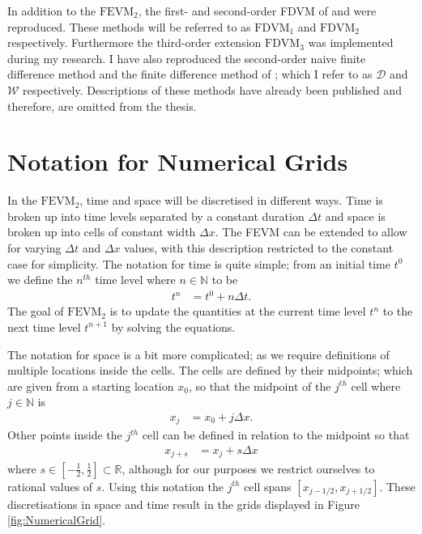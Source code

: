  
In addition to the $\text{FEVM}_2$, the first- and second-order FDVM of \citet{Hank-etal-2010-2034} and \citet{Zoppou-etal-2017} were reproduced. These methods will be referred to as $\text{FDVM}_1$ and $\text{FDVM}_2$ respectively. Furthermore the third-order extension $\text{FDVM}_3$ was implemented during my research. I have also reproduced the second-order naive finite difference method \cite{Pitt-J-2014} and the finite difference method of \citet{El-etal-2006}; which I refer to as $\mathcal{D}$ and $\mathcal{W}$ respectively. Descriptions of these methods have already been published \cite{Zoppou-etal-2017,Pitt-2018-61} and therefore, are omitted from the thesis.


\section{Notation for Numerical Grids}

In the $\text{FEVM}_2$, time and space will be discretised in different ways. Time is broken up into time levels separated by a constant duration $\Delta t$ and space is broken up into cells of constant width $\Delta x$. The FEVM can be extended to allow for varying $\Delta t$ and $\Delta x$ values, with this description restricted to the constant case for simplicity. The notation for time is quite simple; from an initial time $t^0$ we define the $n^{th}$ time level where $n \in \mathbb{N}$ to be
\begin{align*}
t^n &= t^0 + n \Delta t.
\end{align*}
The goal of $\text{FEVM}_2$ is to update the quantities at the current time level $t^n$ to the next time level $t^{n+1}$ by solving the equations. 

The notation for space is a bit more complicated; as we require definitions of multiple locations inside the cells. The cells are defined by their midpoints; which are given from a starting location $x_0$, so that the midpoint of the $j^{th}$ cell where $j \in \mathbb{N}$ is
\begin{align*}
x_j &= x_0 + j \Delta x.
\end{align*}
Other points inside the $j^{th}$ cell can be defined in relation to the midpoint so that 
\begin{align*}
x_{j + s} &= x_j + s \Delta x
\end{align*}
where $s \in \left[-\frac{1}{2} , \frac{1}{2}\right] \subset\mathbb{R}$, although for our purposes we restrict ourselves to rational values of $s$. Using this notation the $j^{th}$ cell spans $\left[x_{j -1/2},x_{j + 1/2}\right]$. These discretisations in space and time result in the grids displayed in Figure \ref{fig:NumericalGrid}.

